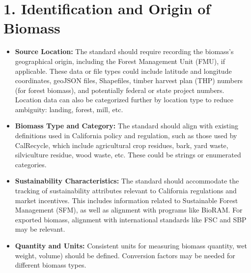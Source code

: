 \documentclass{article}
\begin{document}
\section*{1. Identification and Origin of Biomass}
\begin{itemize}
    \item \textbf{Source Location:} The standard should require recording the biomass's geographical origin, including the Forest Management Unit (FMU), if applicable. These data or file types could include latitude and longitude coordinates, geoJSON files, Shapefiles, timber harvest plan (THP) numbers (for forest biomass), and potentially federal or state project numbers. Location data can also be categorized further by location type to reduce ambiguity: landing, forest, mill, etc.
    \item \textbf{Biomass Type and Category:} The standard should align with existing definitions used in California policy and regulation, such as those used by CalRecycle, which include agricultural crop residues, bark, yard waste, silviculture residue, wood waste, etc. These could be strings or enumerated categories. 
    \item \textbf{Sustainability Characteristics:} The standard should accommodate the tracking of sustainability attributes relevant to California regulations and market incentives. This includes information related to Sustainable Forest Management (SFM), as well as alignment with programs like BioRAM. For exported biomass, alignment with international standards like FSC and SBP may be relevant.
    \item \textbf{Quantity and Units:} Consistent units for measuring biomass quantity, wet weight, volume) should be defined. Conversion factors may be needed for different biomass types.
\end{itemize}
\end{document}

